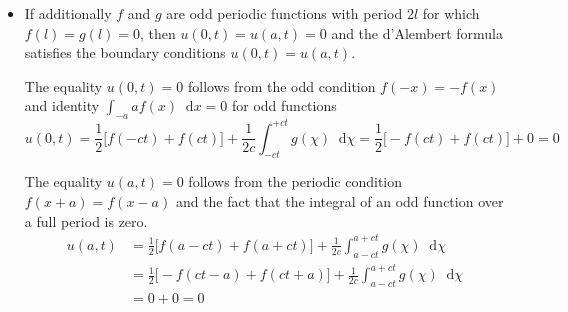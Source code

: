 \documentclass[11pt, a4paper]{article}
\newcommand{\diff}{\mathop{}\!\mathrm{d}} %
\begin{document}
\begin{itemize}
	\item If additionally $ f $ and $ g $ are odd periodic functions with period $ 2l $ for which $ f(l) = g(l) = 0 $, then $ u(0, t) = u(a, t) = 0 $ and the d'Alembert formula satisfies the boundary conditions $ u(0, t) = u(a, t) $. 
	
	The equality $ u(0, t) = 0 $ follows from the odd condition $ f(-x) = -f(x) $ and identity $ \int_{-a}{a}f(x)\diff x = 0 $ for odd functions
	\begin{equation*}
		u(0, t) = \frac{1}{2}\big[ f(-ct) + f(ct)\big] + \frac{1}{2c} \int_{-ct}^{+ct}g(\chi)\diff \chi = \frac{1}{2}\big[-f(ct) + f(ct) \big] + 0 = 0
	\end{equation*}
	
	The equality $ u(a, t) = 0  $ follows from the periodic condition $ f(x + a) = f(x - a) $ and the fact that the integral of an odd function over a full period is zero.
	\begin{align*}
		u(a, t) &= \frac{1}{2}\big[ f(a-ct) + f(a + ct)\big] + \frac{1}{2c} \int_{a-ct}^{a+ct}g(\chi)\diff \chi\\
		&=\frac{1}{2}\big[ -f(ct-a) + f(ct+a)\big] + \frac{1}{2c} \int_{a-ct}^{a+ct}g(\chi)\diff \chi\\
		&= 0 + 0 = 0
	\end{align*}
	
	
\end{itemize}
\end{document}
